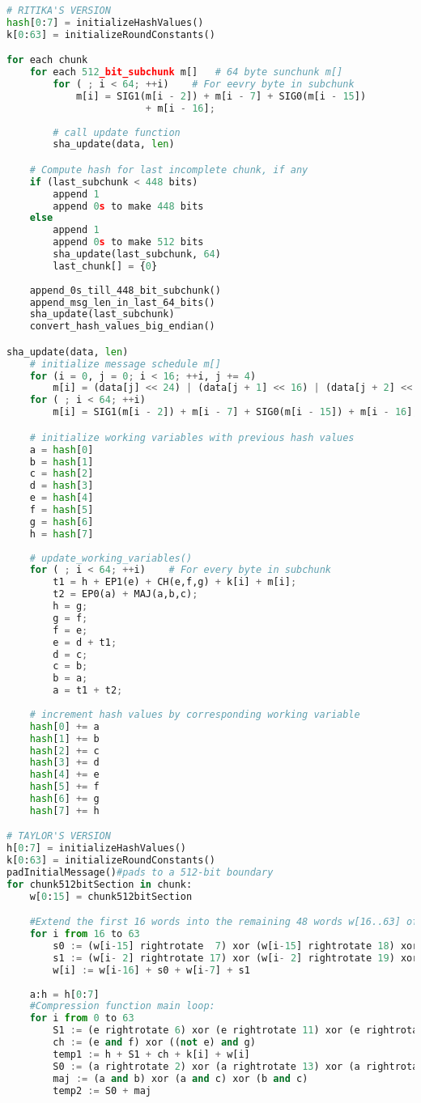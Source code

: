 \documentclass{article}
\begin{document}
\begin{enumerate}
\begin{enumerate}[label=(\alph*)]
\begin{enumerate}[label=(\roman*)]
\begin{lstlisting}[language=python]
# RITIKA'S VERSION
hash[0:7] = initializeHashValues()
k[0:63] = initializeRoundConstants()

for each chunk
	for each 512_bit_subchunk m[]	# 64 byte sunchunk m[]
		for ( ; i < 64; ++i)	# For eevry byte in subchunk
			m[i] = SIG1(m[i - 2]) + m[i - 7] + SIG0(m[i - 15]) 
						+ m[i - 16];
		
		# call update function
		sha_update(data, len)

	# Compute hash for last incomplete chunk, if any
	if (last_subchunk < 448 bits)
		append 1
		append 0s to make 448 bits
	else
		append 1
		append 0s to make 512 bits
		sha_update(last_subchunk, 64)
		last_chunk[] = {0}
		
	append_0s_till_448_bit_subchunk()
	append_msg_len_in_last_64_bits()
	sha_update(last_subchunk)
	convert_hash_values_big_endian()		

sha_update(data, len)
	# initialize message schedule m[]
	for (i = 0, j = 0; i < 16; ++i, j += 4)
		m[i] = (data[j] << 24) | (data[j + 1] << 16) | (data[j + 2] << 8) | (data[j + 3]);
	for ( ; i < 64; ++i)
		m[i] = SIG1(m[i - 2]) + m[i - 7] + SIG0(m[i - 15]) + m[i - 16];

	# initialize working variables with previous hash values
	a = hash[0]
	b = hash[1]
	c = hash[2]
	d = hash[3]
	e = hash[4]
	f = hash[5]
	g = hash[6]
	h = hash[7]
		
	# update_working_variables()
	for ( ; i < 64; ++i)	# For every byte in subchunk
		t1 = h + EP1(e) + CH(e,f,g) + k[i] + m[i];
		t2 = EP0(a) + MAJ(a,b,c);
		h = g;
		g = f;
		f = e;
		e = d + t1;
		d = c;
		c = b;
		b = a;
		a = t1 + t2;
		
	# increment hash values by corresponding working variable
	hash[0] += a	
	hash[1] += b
	hash[2] += c
	hash[3] += d	
	hash[4] += e
	hash[5] += f
	hash[6] += g	
	hash[7] += h

# TAYLOR'S VERSION
h[0:7] = initializeHashValues()
k[0:63] = initializeRoundConstants()
padInitialMessage()#pads to a 512-bit boundary
for chunk512bitSection in chunk:
    w[0:15] = chunk512bitSection

    #Extend the first 16 words into the remaining 48 words w[16..63] of the message schedule array:
    for i from 16 to 63
        s0 := (w[i-15] rightrotate  7) xor (w[i-15] rightrotate 18) xor (w[i-15] rightshift  3)
        s1 := (w[i- 2] rightrotate 17) xor (w[i- 2] rightrotate 19) xor (w[i- 2] rightshift 10)
        w[i] := w[i-16] + s0 + w[i-7] + s1
    
    a:h = h[0:7]
    #Compression function main loop:
    for i from 0 to 63
        S1 := (e rightrotate 6) xor (e rightrotate 11) xor (e rightrotate 25)
        ch := (e and f) xor ((not e) and g)
        temp1 := h + S1 + ch + k[i] + w[i]
        S0 := (a rightrotate 2) xor (a rightrotate 13) xor (a rightrotate 22)
        maj := (a and b) xor (a and c) xor (b and c)
        temp2 := S0 + maj
 

\end{lstlisting}
\end{enumerate}
\end{enumerate}
\end{enumerate}
\end{document}
